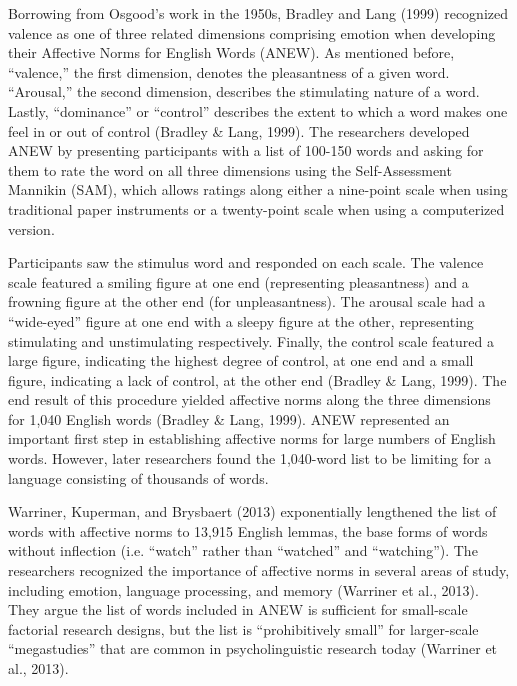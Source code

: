 \documentclass[,man]{apa6}
\begin{document}
Borrowing from Osgood's work in the 1950s, Bradley and Lang (1999) recognized valence as one of three related dimensions comprising emotion when developing their Affective Norms for English Words (ANEW). As mentioned before, \enquote{valence,} the first dimension, denotes the pleasantness of a given word. \enquote{Arousal,} the second dimension, describes the stimulating nature of a word. Lastly, \enquote{dominance} or \enquote{control} describes the extent to which a word makes one feel in or out of control (Bradley \& Lang, 1999). The researchers developed ANEW by presenting participants with a list of 100-150 words and asking for them to rate the word on all three dimensions using the Self-Assessment Mannikin (SAM), which allows ratings along either a nine-point scale when using traditional paper instruments or a twenty-point scale when using a computerized version.

Participants saw the stimulus word and responded on each scale. The valence scale featured a smiling figure at one end (representing pleasantness) and a frowning figure at the other end (for unpleasantness). The arousal scale had a \enquote{wide-eyed} figure at one end with a sleepy figure at the other, representing stimulating and unstimulating respectively. Finally, the control scale featured a large figure, indicating the highest degree of control, at one end and a small figure, indicating a lack of control, at the other end (Bradley \& Lang, 1999). The end result of this procedure yielded affective norms along the three dimensions for 1,040 English words (Bradley \& Lang, 1999). ANEW represented an important first step in establishing affective norms for large numbers of English words. However, later researchers found the 1,040-word list to be limiting for a language consisting of thousands of words.

Warriner, Kuperman, and Brysbaert (2013) exponentially lengthened the list of words with affective norms to 13,915 English lemmas, the base forms of words without inflection (i.e. \enquote{watch} rather than \enquote{watched} and \enquote{watching}). The researchers recognized the importance of affective norms in several areas of study, including emotion, language processing, and memory (Warriner et al., 2013). They argue the list of words included in ANEW is sufficient for small-scale factorial research designs, but the list is \enquote{prohibitively small} for larger-scale \enquote{megastudies} that are common in psycholinguistic research today (Warriner et al., 2013).
\end{document}

